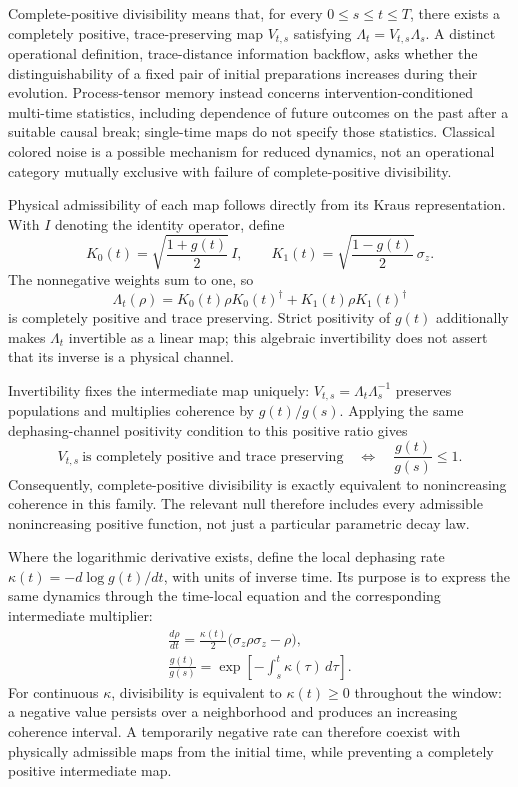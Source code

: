 \documentclass[11pt]{article}
\begin{document}
Complete-positive divisibility means that, for every $0\leq s\leq t\leq T$, there exists a completely positive, trace-preserving map $V_{t,s}$ satisfying $\Lambda_t=V_{t,s}\Lambda_s$. A distinct operational definition, trace-distance information backflow, asks whether the distinguishability of a fixed pair of initial preparations increases during their evolution. Process-tensor memory instead concerns intervention-conditioned multi-time statistics, including dependence of future outcomes on the past after a suitable causal break; single-time maps do not specify those statistics. Classical colored noise is a possible mechanism for reduced dynamics, not an operational category mutually exclusive with failure of complete-positive divisibility.

Physical admissibility of each map follows directly from its Kraus representation. With $I$ denoting the identity operator, define
\[K_0(t)=\sqrt{\frac{1+g(t)}{2}}\,I,\qquad K_1(t)=\sqrt{\frac{1-g(t)}{2}}\,\sigma_z.\]
The nonnegative weights sum to one, so \[\Lambda_t(\rho)=K_0(t)\rho K_0(t)^\dagger+K_1(t)\rho K_1(t)^\dagger\] is completely positive and trace preserving. Strict positivity of $g(t)$ additionally makes $\Lambda_t$ invertible as a linear map; this algebraic invertibility does not assert that its inverse is a physical channel.

Invertibility fixes the intermediate map uniquely: $V_{t,s}=\Lambda_t\Lambda_s^{-1}$ preserves populations and multiplies coherence by $g(t)/g(s)$. Applying the same dephasing-channel positivity condition to this positive ratio gives
\[V_{t,s}\ \text{is completely positive and trace preserving}\quad\Longleftrightarrow\quad\frac{g(t)}{g(s)}\leq1.\]
Consequently, complete-positive divisibility is exactly equivalent to nonincreasing coherence in this family. The relevant null therefore includes every admissible nonincreasing positive function, not just a particular parametric decay law.

Where the logarithmic derivative exists, define the local dephasing rate $\kappa(t)=-d\log g(t)/dt$, with units of inverse time. Its purpose is to express the same dynamics through the time-local equation and the corresponding intermediate multiplier:
\[\begin{gathered}\frac{d\rho}{dt}=\frac{\kappa(t)}{2}\bigl(\sigma_z\rho\sigma_z-\rho\bigr), \\ \frac{g(t)}{g(s)}=\exp\!\left[-\int_s^t\kappa(\tau)\,d\tau\right].\end{gathered}\]
For continuous $\kappa$, divisibility is equivalent to $\kappa(t)\geq0$ throughout the window: a negative value persists over a neighborhood and produces an increasing coherence interval. A temporarily negative rate can therefore coexist with physically admissible maps from the initial time, while preventing a completely positive intermediate map.
\end{document}
